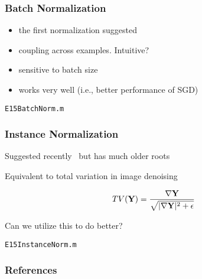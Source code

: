 \documentclass[12pt,fleqn,handout]{beamer}
\begin{document}
\begin{frame}[fragile]\frametitle{Batch Normalization}

\begin{itemize}
\item
the first normalization suggested~\cite{IoffeSzegedy2015}
\item
coupling across examples. Intuitive?

\item sensitive to batch size
\item 
works very well (i.e., better performance of SGD)
\end{itemize}

\bigskip

\begin{center}
	\texttt{E15BatchNorm.m}
\end{center}

\end{frame}

\begin{frame}[fragile]\frametitle{Instance Normalization}

Suggested recently~\cite{UlyanovEtAl2016} but has much older roots

Equivalent to total variation in image denoising~\cite{RudinOsherFatemi1992}

$$TV({\bf Y}) = {\frac {\nabla {\bf Y}}{\sqrt{ |\nabla {\bf Y}|^2 + \epsilon}}} $$

Can we utilize this to do better?

\begin{center}
	\texttt{E15InstanceNorm.m}
\end{center}




\end{frame}

\begin{frame}[allowframebreaks]
	\frametitle{References}



\end{frame}
\end{document}
